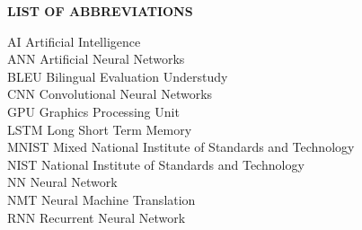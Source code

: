 \documentclass[12pt,a4paper]{report}
\begin{document}



\begin{singlespace}


\newpage
\setlength{\cftbeforetoctitleskip}{-4em}  %
\tableofcontents
\newpage
{}
\setlength{\cftbeforelottitleskip}{-4em}  %
\listoftables
\newpage
{}
\setlength{\cftbeforeloftitleskip}{-4em}   %
\listoffigures
\end{singlespace}

\newpage
{}
\begin{center}
{\LARGE \bf LIST OF ABBREVIATIONS}\\
\end{center}
\vspace{1.6cm}
AI \dotfill Artificial Intelligence\\
ANN \dotfill Artificial Neural Networks\\
BLEU \dotfill Bilingual Evaluation Understudy\\
CNN \dotfill Convolutional Neural Networks\\
GPU \dotfill Graphics Processing Unit\\
LSTM \dotfill Long Short Term Memory\\
MNIST \dotfill Mixed National Institute of Standards and Technology\\
NIST \dotfill National Institute of Standards and Technology\\
NN \dotfill Neural Network\\
NMT \dotfill Neural Machine Translation\\
RNN \dotfill Recurrent Neural Network\\


\newpage
{}
\pagestyle{headings}
\flushbottom

\flushbottom
\flushbottom

\flushbottom
\end{document}
